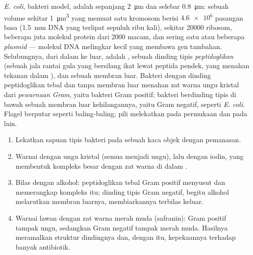 \begin{proposition}\label{prop:b1:cell-unit-of-life:bacterium}
\emph{E. coli}, bakteri model, adalah  sepanjang \qty{2}{\micro m}
dan selebar \qty{0.8}{\micro m}: sebuah volume sekitar
\qty{1}{\micro m^3} yang memuat satu kromosom berisi $\num{4.6e6}$
pasangan basa (\qty{1.5}{mm} DNA yang terlipat sepuluh ribu kali),
sekitar \num{20000} ribosom, beberapa juta molekul protein dari
\num{2000} macam, dan sering satu atau beberapa
\emph{plasmid} --- molekul DNA melingkar kecil yang
membawa gen tambahan. Selubungnya, dari dalam ke luar, adalah , sebuah dinding tipis \emph{peptidoglikan}
(sebuah jala rantai gula yang bersilang ikat lewat peptida pendek, yang
menahan tekanan dalam ), dan sebuah membran luar. Bakteri dengan
dinding peptidoglikan tebal dan tanpa membran luar menahan zat warna
ungu kristal dari \emph{pewarnaan Gram}, yaitu
bakteri Gram positif; bakteri berdinding tipis di bawah sebuah membran
luar kehilangannya, yaitu Gram negatif, seperti \emph{E. coli}. Flagel berputar seperti baling-baling;
pili melekatkan  pada permukaan dan pada  lain.
\end{proposition}

\begin{method}\label{met:b1:cell-unit-of-life:gram}
\begin{enumerate}
  \item Lekatkan sapuan tipis bakteri pada sebuah kaca objek dengan
        pemanasan.
  \item Warnai dengan ungu kristal (semua  menjadi ungu), lalu dengan
        iodin, yang membentuk kompleks besar dengan zat warna di dalam
        .
  \item Bilas dengan alkohol: peptidoglikan tebal  Gram positif
        menyusut dan memerangkap kompleks itu; dinding tipis  Gram
        negatif, begitu alkohol melarutkan membran luarnya, membiarkannya
        terbilas keluar.
  \item Warnai lawan dengan zat warna merah muda (safranin):  Gram
        positif tampak ungu, sedangkan  Gram negatif tampak merah
        muda. Hasilnya
        meramalkan struktur dindingnya dan, dengan itu, kepekaannya
        terhadap banyak antibiotik.
\end{enumerate}
\end{method}

